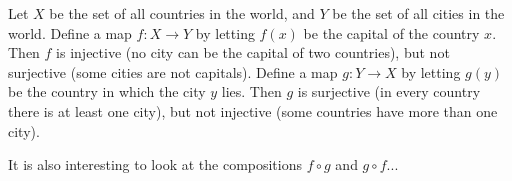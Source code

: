 

\setcounter{section}{2}
\setcounter{subsection}{1}
\setcounter{dfn}{1}

\begin{exl}
Let $X$ be the set of all countries in the world, and $Y$ be the set of all cities in the world.
Define a map $f \colon X \to Y$ by letting $f(x)$ be the capital of the country $x$.
Then $f$ is injective (no city can be the capital of two countries), but not surjective (some cities are not capitals).
Define a map $g \colon Y \to X$ by letting $g(y)$ be the country in which the city $y$ lies.
Then $g$ is surjective (in every country there is at least one city), but not injective (some countries have more than one city).

It is also interesting to look at the compositions $f \circ g$ and $g \circ f$...
\end{exl}

